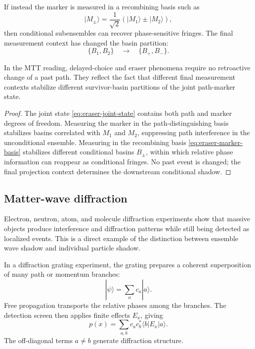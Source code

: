 \documentclass[11pt]{article}
\begin{document}
If instead the marker is measured in a recombining basis such as
\begin{equation}
  |M_\pm\rangle
  =
  \frac{1}{\sqrt2}
  (|M_1\rangle\pm |M_2\rangle),
  \label{eq:eraser-marker-basis}
\end{equation}
then conditional subensembles can recover phase-sensitive fringes. The final measurement
context has changed the basin partition:
\begin{equation}
  \{B_1,B_2\}
  \quad\longrightarrow\quad
  \{B_+,B_-\}.
\end{equation}

\begin{proposition}
\label{prop:no-retrocausal-eraser}
In the MTT reading, delayed-choice and eraser phenomena require no retroactive change of a
past path. They reflect the fact that different final measurement contexts stabilize different
survivor-basin partitions of the joint path-marker state.
\end{proposition}

\begin{proof}
The joint state \eqref{eq:eraser-joint-state} contains both path and marker degrees of
freedom. Measuring the marker in the path-distinguishing basis stabilizes basins correlated
with \(M_1\) and \(M_2\), suppressing path interference in the unconditional ensemble.
Measuring in the recombining basis \eqref{eq:eraser-marker-basis} stabilizes different
conditional basins \(B_\pm\), within which relative phase information can reappear as
conditional fringes. No past event is changed; the final projection context determines the
downstream conditional shadow.
\end{proof}

\subsection{Matter-wave diffraction}
\label{subsec:matter-wave-diffraction}

Electron, neutron, atom, and molecule diffraction experiments show that massive objects
produce interference and diffraction patterns while still being detected as localized events.
This is a direct example of the distinction between ensemble wave shadow and individual
particle shadow.

In a diffraction grating experiment, the grating prepares a coherent superposition of many
path or momentum branches:
\begin{equation}
  |\psi\rangle
  =
  \sum_{a} c_a|a\rangle.
\end{equation}
Free propagation transports the relative phases among the branches. The detection screen
then applies finite effects \(E_x\), giving
\begin{equation}
  p(x)
  =
  \sum_{a,b}
  c_a c_b^\ast
  \langle b|E_x|a\rangle.
  \label{eq:diffraction-prob}
\end{equation}
The off-diagonal terms \(a\neq b\) generate diffraction structure.
\end{document}

